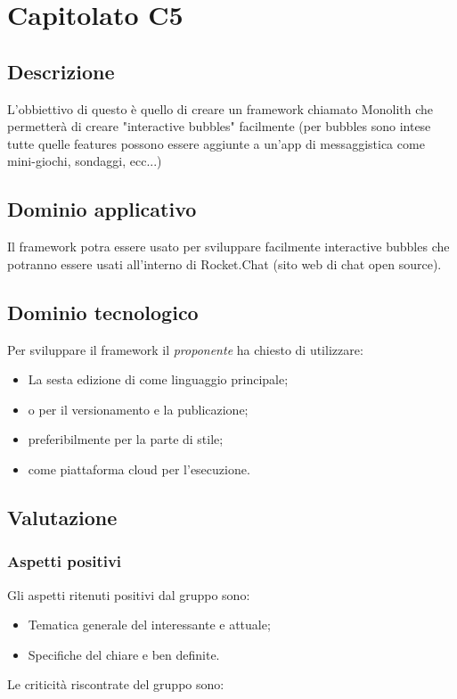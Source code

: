 \documentclass[../StudioDiFattibilita.tex]{subfiles}
\begin{document}
	\section{Capitolato C5}
		\subsection{Descrizione}
		L'obbiettivo di questo  è quello di creare un framework chiamato Monolith che permetterà di creare "interactive bubbles" facilmente (per bubbles sono intese tutte quelle features possono essere aggiunte a un'app di messaggistica come mini-giochi, sondaggi, ecc...)   
		\subsection{Dominio applicativo}
		Il framework potra essere usato per sviluppare facilmente interactive bubbles che potranno essere usati all'interno di Rocket.Chat (sito web di chat open source).
		\subsection{Dominio tecnologico}
		Per sviluppare il framework il \textit{proponente} ha chiesto di utilizzare:
			\begin{itemize}
			\item La sesta edizione di  come linguaggio principale; 
			\item {} o  per il versionamento e la publicazione;
			\item {} preferibilmente per la parte di stile;
			\item {} come piattaforma cloud per l'esecuzione.
			\end{itemize}
		\subsection{Valutazione}
			\subsubsection{Aspetti positivi}
			Gli aspetti ritenuti positivi dal gruppo sono:
				\begin{itemize}
				\item Tematica generale del  interessante e attuale;
				\item Specifiche del  chiare e ben definite.
				\end{itemize}
			Le criticità riscontrate del gruppo sono:	
\end{document}
